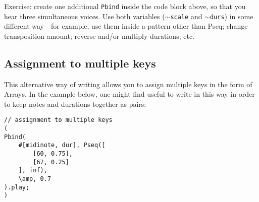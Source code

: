 Exercise: create one additional \texttt{Pbind} inside the code block above, so that you hear three simultaneous voices. Use both variables (\texttt{$\sim$scale} and \texttt{$\sim$durs}) in some different way---for example, use them inside a pattern other than Pseq; change transposition amount; reverse and/or multiply durations; etc.

\subsection{Assignment to multiple keys}

This alternative way of writing allows you to assign multiple keys in the form of Arrays. In the example below, one might find useful to write in this way in order to keep notes and durations together as pairs:

\begin{lstlisting}[style=SuperCollider-IDE, basicstyle=\scttfamily\footnotesize]
// assignment to multiple keys
(
Pbind(
	#[midinote, dur], Pseq([
		[60, 0.75],
		[67, 0.25]
	], inf),
	\amp, 0.7
).play;
)
\end{lstlisting}